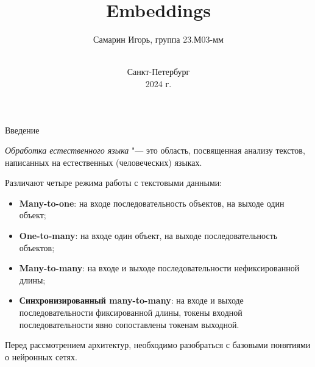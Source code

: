 \documentclass[notheorems, handout, 10pt]{beamer}
\title[Embeddings]{Embeddings}
\author[Самарин И.А.]{Самарин Игорь, группа 23.М03-мм}
\institute{Санкт-Петербургский государственный университет\\Кафедра статистического моделирования}
\date{\vspace{3cm}\\Санкт-Петербург\\2024 г.}
\begin{document}
	
	\listoftables

	\begin{frame}[plain]
		
		\titlepage
		
		\note{ 
			
		}
		
	\end{frame}
	
	\begin{frame}{Введение}
		
		\textsl{Обработка естественного языка} "--- это область, посвященная анализу текстов, написанных на естественных (человеческих) языках. 
		
		\vspace{0.2cm}
		
		Различают четыре режима работы с текстовыми данными:
		\begin{itemize}
			\item \textbf{Many-to-one}: на входе последовательность объектов, на выходе один объект;
			\item \textbf{One-to-many}: на входе один объект, на выходе последовательность объектов;
			\item \textbf{Many-to-many}: на входе и выходе последовательности нефиксированной длины;
			\item \textbf{Синхронизированный many-to-many}: на входе и выходе последовательности фиксированной длины, токены входной последовательности явно сопоставлены токенам выходной.
		\end{itemize}
		
		Перед рассмотрением архитектур, необходимо разобраться с базовыми понятиями о нейронных сетях.
		
		\note{
			
		}
		
	\end{frame}
	
\end{document}
